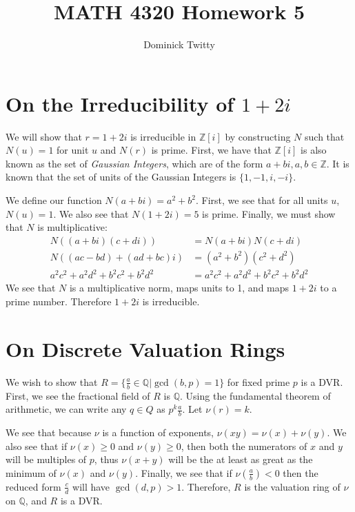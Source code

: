 \documentclass[12pt]{article}
\newcommand*{\Z}{\mathbb{Z}}
\newcommand*{\Q}{\mathbb{Q}}
\begin{document}
\title{MATH 4320 Homework 5}
\author{Dominick Twitty}
\date{}
\maketitle

\section{On the Irreducibility of $1 + 2i$}
We will show that $r = 1 + 2i$ is irreducible in $\Z[i]$ by constructing $N$ such that $N(u) = 1$ for unit $u$ and $N(r)$ is prime. First, we have that $\Z[i]$ is also known as the set of \emph{Gaussian Integers}, which are of the form $a + bi, a,b \in \Z$. It is known that the set of units of the Gaussian Integers is $\{1, -1, i, -i\}$.

We define our function $N(a + bi) = a^2 + b^2$. First, we see that for all units $u$, $N(u) = 1$. We also see that $N(1 + 2i) = 5$ is prime. Finally, we must show that $N$ is multiplicative:
\begin{align*}
N((a + bi)(c + di)) &= N(a + bi)N(c + di)\\
N((a c - bd) + (a d + bc)i ) &= (a^2 + b^2)(c^2 + d^2)\\
a^2 c^2+a^2 d^2+b^2 c^2+b^2 d^2 &= a^2 c^2+a^2 d^2+b^2 c^2+b^2 d^2
\end{align*}
We see that $N$ is a multiplicative norm, maps units to 1, and maps $1 + 2i$ to a prime number. Therefore $1 + 2i$ is irreducible.

\section{On Discrete Valuation Rings}
We wish to show that $R = \{\frac{a}{b} \in \Q | \gcd(b, p) = 1\}$ for fixed prime $p$ is a DVR. First, we see the fractional field of $R$ is $\Q$. Using the fundamental theorem of arithmetic, we can write any $q \in Q$ as $p^k \frac{a}{b}$. Let $\nu(r) = k$. 

We see that because $\nu$ is a function of exponents, $\nu(x y) = \nu(x) + \nu(y)$. We also see that if $\nu(x) \geq 0$ and $\nu(y) \geq 0$, then both the numerators of $x$ and $y$ will be multiples of $p$, thus $\nu(x + y)$ will be the at least as great as the minimum of $\nu(x)$ and $\nu(y)$. Finally, we see that if $\nu(\frac{a}{b}) < 0$ then the reduced form $\frac{c}{d}$ will have $\gcd(d, p) > 1$. Therefore, $R$ is the valuation ring of $\nu$ on $\Q$, and $R$ is a DVR.

\pagebreak
\end{document}
